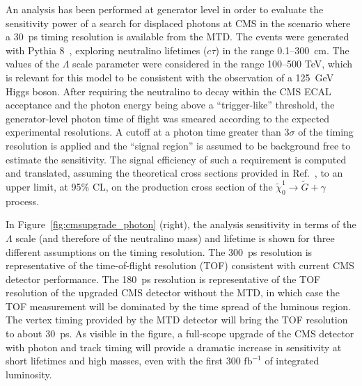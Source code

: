 An analysis has been performed at generator level in order to evaluate the sensitivity power of a search for displaced photons at CMS in the scenario where a 30~ps timing resolution is available from the MTD. The events were generated with Pythia 8~\cite{Sjostrand:2007gs}, exploring neutralino lifetimes ($c\tau$) in the range 0.1--300~cm. The values of the $\Lambda$ scale parameter were considered in the range 100--500 TeV, which is relevant for this model to be consistent with the observation of a 125~GeV Higgs boson. After requiring the neutralino to decay within the CMS ECAL acceptance and the photon energy being above a ``trigger-like'' threshold, the generator-level photon time of flight was smeared according to the expected experimental resolutions. A cutoff at a photon time greater than 3$\sigma$ of the timing resolution is applied and the ``signal region'' is assumed to be background free to estimate the sensitivity. The signal efficiency of such a requirement is computed and translated, assuming the theoretical cross sections provided in Ref.~\cite{Strassler:2006im}, to an upper limit, at 95\% CL, on the production cross section of the $\tilde{\chi}_0^1 \to \tilde{G} + \gamma$ process.

In Figure~\ref{fig:cmsupgrade_photon} (right), the analysis sensitivity in terms of the $\Lambda$ scale (and therefore of the neutralino mass) and lifetime is shown for three different assumptions on the timing resolution. The 300~ps resolution is representative of the time-of-flight resolution (TOF) consistent with current CMS detector performance. The 180~ps resolution is representative of the TOF resolution of the upgraded CMS detector without the MTD, in which case the TOF measurement will be dominated by the time spread of the luminous region. The vertex timing provided by the MTD detector will bring the TOF resolution to about 30~ps. As visible in the figure, a full-scope upgrade of the CMS detector with photon and track timing will provide a dramatic increase in sensitivity at short lifetimes and high masses, even with the first $300\,\,\mathrm{fb}^{-1}$ of integrated luminosity.

